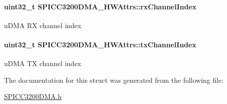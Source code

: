 \paragraph[{rx\-Channel\-Index}]{\setlength{\rightskip}{0pt plus 5cm}uint32\-\_\-t S\-P\-I\-C\-C3200\-D\-M\-A\-\_\-\-H\-W\-Attrs\-::rx\-Channel\-Index}\label{struct_s_p_i_c_c3200_d_m_a___h_w_attrs_af577e5b6488f282f910e7dbd733329f4}
u\-D\-M\-A R\-X channel index 
\paragraph[{tx\-Channel\-Index}]{\setlength{\rightskip}{0pt plus 5cm}uint32\-\_\-t S\-P\-I\-C\-C3200\-D\-M\-A\-\_\-\-H\-W\-Attrs\-::tx\-Channel\-Index}\label{struct_s_p_i_c_c3200_d_m_a___h_w_attrs_a1ad85ea904b8d879b260e46ef44d9882}
u\-D\-M\-A T\-X channel index 

The documentation for this struct was generated from the following file\-:\begin{DoxyCompactItemize}
\item 
\hyperlink{_s_p_i_c_c3200_d_m_a_8h}{S\-P\-I\-C\-C3200\-D\-M\-A.\-h}\end{DoxyCompactItemize}
